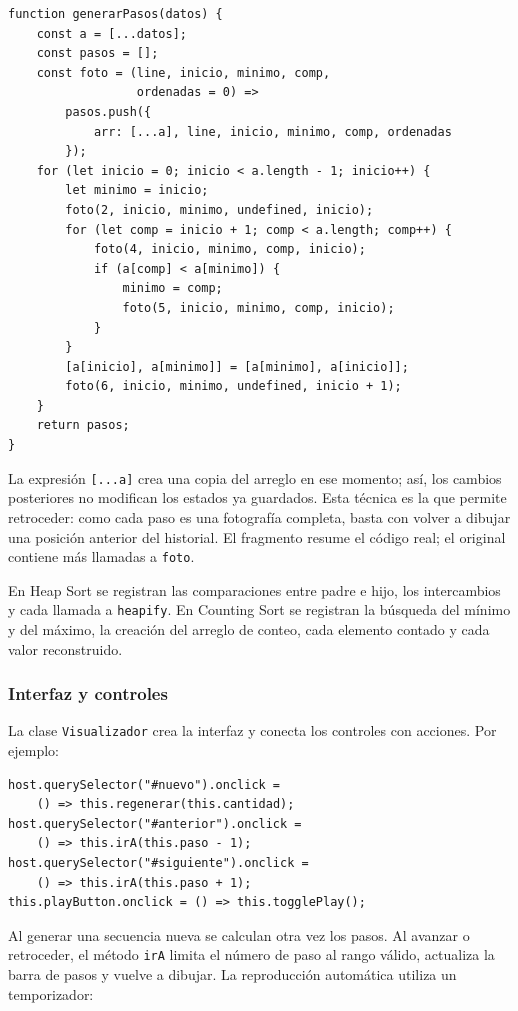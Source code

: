 \documentclass[12pt,a4paper]{article}
\begin{document}
\begin{lstlisting}[caption={Registro de estados en Selection Sort}]
function generarPasos(datos) {
    const a = [...datos];
    const pasos = [];
    const foto = (line, inicio, minimo, comp,
                  ordenadas = 0) =>
        pasos.push({
            arr: [...a], line, inicio, minimo, comp, ordenadas
        });
    for (let inicio = 0; inicio < a.length - 1; inicio++) {
        let minimo = inicio;
        foto(2, inicio, minimo, undefined, inicio);
        for (let comp = inicio + 1; comp < a.length; comp++) {
            foto(4, inicio, minimo, comp, inicio);
            if (a[comp] < a[minimo]) {
                minimo = comp;
                foto(5, inicio, minimo, comp, inicio);
            }
        }
        [a[inicio], a[minimo]] = [a[minimo], a[inicio]];
        foto(6, inicio, minimo, undefined, inicio + 1);
    }
    return pasos;
}
\end{lstlisting}

La expresión \texttt{[...a]} crea una copia del arreglo en ese momento; así, los cambios posteriores no modifican los estados ya guardados. Esta técnica es la que permite retroceder: como cada paso es una fotografía completa, basta con volver a dibujar una posición anterior del historial. El fragmento resume el código real; el original contiene más llamadas a \texttt{foto}.

En Heap Sort se registran las comparaciones entre padre e hijo, los intercambios y cada llamada a \texttt{heapify}. En Counting Sort se registran la búsqueda del mínimo y del máximo, la creación del arreglo de conteo, cada elemento contado y cada valor reconstruido.

\subsubsection{Interfaz y controles}

La clase \texttt{Visualizador} crea la interfaz y conecta los controles con acciones. Por ejemplo:

\begin{lstlisting}[caption={Controles del visualizador}]
host.querySelector("#nuevo").onclick =
    () => this.regenerar(this.cantidad);
host.querySelector("#anterior").onclick =
    () => this.irA(this.paso - 1);
host.querySelector("#siguiente").onclick =
    () => this.irA(this.paso + 1);
this.playButton.onclick = () => this.togglePlay();
\end{lstlisting}

Al generar una secuencia nueva se calculan otra vez los pasos. Al avanzar o retroceder, el método \texttt{irA} limita el número de paso al rango válido, actualiza la barra de pasos y vuelve a dibujar. La reproducción automática utiliza un temporizador:
\end{document}
